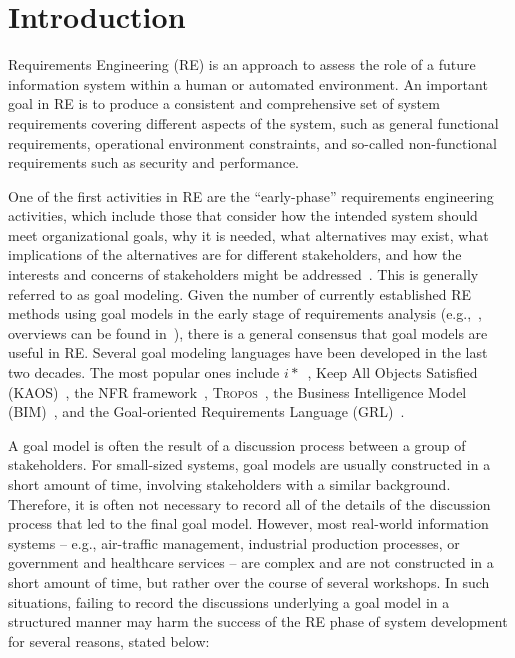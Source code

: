 \section{Introduction}
\label{sect:introduction}

Requirements Engineering (RE) is an approach to assess the role of a future information system within a human or automated environment. An important goal in RE is to produce a consistent and comprehensive set of system requirements covering different aspects of the system, such as general functional requirements, operational environment constraints, and so-called non-functional requirements such as security and performance. 

One of the first activities in RE are the ``early-phase'' requirements engineering activities, which include those that consider how the intended system should meet organizational goals, why it is needed, what alternatives may exist, what implications of the alternatives are for different stakeholders, and how the interests and concerns of stakeholders might be addressed~\cite{yu1997towards}. This is generally referred to as goal modeling. Given the number of currently established RE methods using goal models in the early stage of requirements analysis (e.g.,~\cite{liu2004designing,donzelli2004goal,dardenne1993goal,chung2012non,castro2002towards}, overviews can be found in~\cite{van2001goal,kavakliL05}), there is a general consensus that goal models are useful in RE. Several goal modeling languages have been developed in the last two decades. The most popular ones include $i*$~\cite{Yu:1997:TMR:827255.827807}, Keep All Objects Satisfied (KAOS)~\cite{van2008requirements}, the NFR framework~\cite{chung2012non}, \textsc{Tropos}~\cite{giorgini2005goal}, the Business Intelligence Model (BIM)~\cite{horkoff2014strategic}, and the Goal-oriented Requirements Language (GRL)~\cite{Amyot:2010:EGM:1841349.1841356}.

A goal model is often the result of a discussion process between a group of stakeholders. For small-sized systems, goal models are usually constructed in a short amount of time, involving stakeholders with a similar background. Therefore, it is often not necessary to record all of the details of the discussion process that led to the final goal model. However, most real-world information systems -- e.g., air-traffic management, industrial production processes, or government and healthcare services -- are complex and are not constructed in a short amount of time, but rather over the course of several workshops. In such situations, failing to record the discussions underlying a goal model in a structured manner may harm the success of the RE phase of system development for several reasons, stated below:

